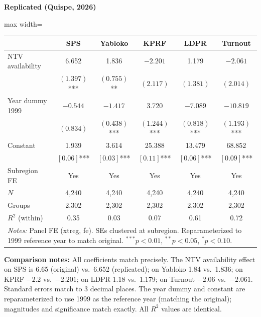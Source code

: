 \documentclass[11pt,a4paper]{article}
\begin{document}
\begin{minipage}[t]{0.48\textwidth}
\centering
\textbf{\large Replicated (Quispe, 2026)}
\vspace{0.3cm}

\begin{adjustbox}{max width=\textwidth}
\begin{tabular}{lccccc}
\toprule
 & SPS & Yabloko & KPRF & LDPR & Turnout \\
\midrule
NTV availability & 6.652 & 1.836 & $-2.201$ & 1.179 & $-2.061$ \\
 & $(1.397)$*** & $(0.755)$** & $(2.117)$ & $(1.381)$ & $(2.014)$ \\[0.3em]
Year dummy 1999 & $-0.544$ & $-1.417$ & 3.720 & $-7.089$ & $-10.819$ \\
 & $(0.834)$ & $(0.438)$*** & $(1.244)$*** & $(0.818)$*** & $(1.193)$*** \\[0.3em]
Constant & 1.939 & 3.614 & 25.388 & 13.479 & 68.852 \\
 & $[0.06]$*** & $[0.03]$*** & $[0.11]$*** & $[0.06]$*** & $[0.09]$*** \\[0.3em]
\midrule
Subregion FE & Yes & Yes & Yes & Yes & Yes \\
$N$ & 4,240 & 4,240 & 4,240 & 4,240 & 4,240 \\
Groups & 2,302 & 2,302 & 2,302 & 2,302 & 2,302 \\
$R^2$ (within) & 0.35 & 0.03 & 0.07 & 0.61 & 0.72 \\
\bottomrule
\multicolumn{6}{p{0.95\textwidth}}{\footnotesize\textit{Notes:} Panel FE (xtreg, fe). SEs clustered at subregion. Reparameterized to 1999 reference year to match original. $^{***}p<0.01$, $^{**}p<0.05$, $^{*}p<0.10$.}
\end{tabular}
\end{adjustbox}
\end{minipage}

\vspace{1cm}
\textbf{Comparison notes:} All coefficients match precisely. The NTV availability effect on SPS is 6.65 (original) vs.\ 6.652 (replicated); on Yabloko 1.84 vs.\ 1.836; on KPRF $-2.2$ vs.\ $-2.201$; on LDPR 1.18 vs.\ 1.179; on Turnout $-2.06$ vs.\ $-2.061$. Standard errors match to 3 decimal places. The year dummy and constant are reparameterized to use 1999 as the reference year (matching the original); magnitudes and significance match exactly. All $R^2$ values are identical.

\newpage

\end{document}
